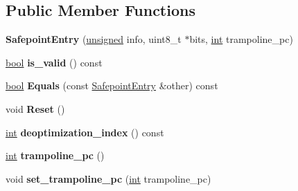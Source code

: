 \subsection*{Public Member Functions}
\begin{DoxyCompactItemize}
\item 
\mbox{\label{classv8_1_1internal_1_1SafepointEntry_a714b9ac0280fb736fce0b4bc375b1bbf}} 
{\bfseries Safepoint\+Entry} (\mbox{\hyperlink{classunsigned}{unsigned}} info, uint8\+\_\+t $\ast$bits, \mbox{\hyperlink{classint}{int}} trampoline\+\_\+pc)
\item 
\mbox{\label{classv8_1_1internal_1_1SafepointEntry_a6ee4a4b1b646265e585d4ef9b8d8403e}} 
\mbox{\hyperlink{classbool}{bool}} {\bfseries is\+\_\+valid} () const
\item 
\mbox{\label{classv8_1_1internal_1_1SafepointEntry_a2d1d1d684af2456943055c68e298dcf8}} 
\mbox{\hyperlink{classbool}{bool}} {\bfseries Equals} (const \mbox{\hyperlink{classv8_1_1internal_1_1SafepointEntry}{Safepoint\+Entry}} \&other) const
\item 
\mbox{\label{classv8_1_1internal_1_1SafepointEntry_a9c00b6b4189a9f81b5e4f533eccd84a1}} 
void {\bfseries Reset} ()
\item 
\mbox{\label{classv8_1_1internal_1_1SafepointEntry_a08b40c6b4598f81680c2c0f50f010c1a}} 
\mbox{\hyperlink{classint}{int}} {\bfseries deoptimization\+\_\+index} () const
\item 
\mbox{\label{classv8_1_1internal_1_1SafepointEntry_a82cecbcae9304d4057da0a7e92ba6d17}} 
\mbox{\hyperlink{classint}{int}} {\bfseries trampoline\+\_\+pc} ()
\item 
\mbox{\label{classv8_1_1internal_1_1SafepointEntry_a36f992a492584a3bf2d1238adb4609a5}} 
void {\bfseries set\+\_\+trampoline\+\_\+pc} (\mbox{\hyperlink{classint}{int}} trampoline\+\_\+pc)
\item 
\mbox{\label{classv8_1_1internal_1_1SafepointEntry_a43cf815353cb2203dead442a0b1df138}} 

\end{DoxyCompactItemize}
